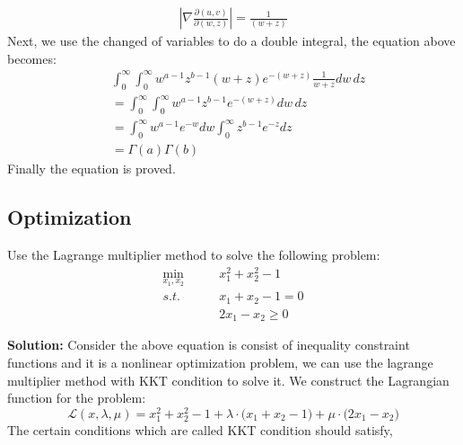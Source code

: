 \documentclass[a4paper]{article}
\begin{document}
\begin{equation}
    \begin{aligned}
        \left|\nabla\frac{\partial(u, v)}{\partial(w, z)}\right| = \frac{1}{(w + z)} 
    \end{aligned}
\end{equation}
Next, we use the changed of variables to do a double integral, the equation above becomes:
\begin{equation}
    \begin{aligned}
        &\int_0^\infty \int_0^\infty w^{a-1} z^{b-1} (w + z) e^{-(w + z)} \frac{1}{w + z} dw \, dz \\
        &= \int_0^\infty \int_0^\infty w^{a-1} z^{b-1} e^{-(w + z)}  dw \, dz \\
        &= \int_0^\infty w^{a-1}e^{-w} dw  \int_0^\infty z^{b-1} e^{- z} dz \\
        &= \Gamma(a)\Gamma(b)
    \end{aligned}
\end{equation}    
Finally the equation is proved.

\subsection{Optimization}

Use the Lagrange multiplier method to solve the following problem:
\begin{equation}
    \begin{aligned}
        \min_{x_1, x_2}    \qquad& x_{1}^{2} + x_{2}^{2} - 1 \\
        s.t.\qquad & x_{1} + x_{2} - 1 =0 \\
        & 2x_{1} - x_{2} \ge 0
    \end{aligned}
\end{equation}    

\textbf{Solution:} Consider the above equation is consist of inequality constraint functions and it is a nonlinear optimization problem, we can use the lagrange multiplier method with KKT condition to solve it. We construct the Lagrangian function for the problem:
\begin{equation}
    \mathcal{L}(x,\lambda, \mu) = x_{1}^{2} + x_{2}^{2} - 1 + \lambda \cdot \Big(x_{1} + x_{2} - 1\Big) + \mu \cdot \Big(2x_{1} - x_{2}\Big)
\end{equation}    
The certain conditions which are called KKT condition should satisfy,
\end{document}
